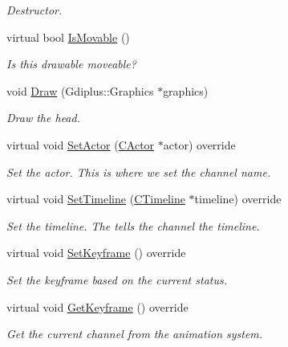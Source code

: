 \begin{DoxyCompactItemize}
\begin{DoxyCompactList}\small\item\em Destructor. \end{DoxyCompactList}\item 
virtual bool \hyperlink{class_c_knife_a838e9409d22b1cc04d584abc611b65e6}{Is\+Movable} ()
\begin{DoxyCompactList}\small\item\em Is this drawable moveable? \end{DoxyCompactList}\item 
void \hyperlink{class_c_knife_a71b0ee76740242e1e04f1f1500422ca3}{Draw} (Gdiplus\+::\+Graphics $\ast$graphics)
\begin{DoxyCompactList}\small\item\em Draw the head. \end{DoxyCompactList}\item 
virtual void \hyperlink{class_c_knife_a1586c8502c39cd3032785d946a1f3f73}{Set\+Actor} (\hyperlink{class_c_actor}{C\+Actor} $\ast$actor) override
\begin{DoxyCompactList}\small\item\em Set the actor. This is where we set the channel name. \end{DoxyCompactList}\item 
virtual void \hyperlink{class_c_knife_a74c7de63a301d48c10b9dd0ad2c45735}{Set\+Timeline} (\hyperlink{class_c_timeline}{C\+Timeline} $\ast$timeline) override
\begin{DoxyCompactList}\small\item\em Set the timeline. The tells the channel the timeline. \end{DoxyCompactList}\item 
\hypertarget{class_c_knife_ab2631848d790223266fb0ea6b8540d34}{virtual void \hyperlink{class_c_knife_ab2631848d790223266fb0ea6b8540d34}{Set\+Keyframe} () override}\label{class_c_knife_ab2631848d790223266fb0ea6b8540d34}

\begin{DoxyCompactList}\small\item\em Set the keyframe based on the current status. \end{DoxyCompactList}\item 
\hypertarget{class_c_knife_ae68af382999c5ed27feae4e210a2ff2f}{virtual void \hyperlink{class_c_knife_ae68af382999c5ed27feae4e210a2ff2f}{Get\+Keyframe} () override}\label{class_c_knife_ae68af382999c5ed27feae4e210a2ff2f}

\begin{DoxyCompactList}\small\item\em Get the current channel from the animation system. \end{DoxyCompactList}\end{DoxyCompactItemize}

